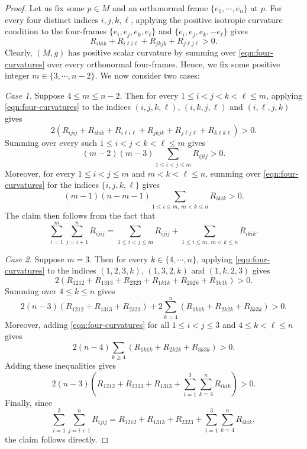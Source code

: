 \documentclass[11pt]{amsart}
\theoremstyle{definition}
\begin{document}
\begin{proof}
    Let us fix some $p\in M$ and an orthonormal frame $\{e_1,\cdots,e_n\}$ at $p$. For every four distinct indices $i,j,k,\ell$, applying the positive isotropic curvature condition to the four-frames $\{e_i,e_j,e_k,e_{\ell}\}$ and $\{e_i,e_j,e_k,-e_{\ell}\}$ gives
    \begin{equation}\label{eqn:four-curvatures}
    R_{ikik}+R_{i\ell i\ell}+R_{jkjk}+R_{j\ell j\ell}>0.
    \end{equation}
    Clearly, $(M,g)$ has positive scalar curvature by summing over \eqref{eqn:four-curvatures} over every orthonormal four-frames. Hence, we fix some positive integer $m\in \{3,\cdots,n-2\}$. We now consider two cases:

    \textit{Case 1.} Suppose $4\leq m\leq n-2$. Then for every $1\leq i<j<k<\ell\leq m$, applying \eqref{eqn:four-curvatures} to the indices $(i,j,k,\ell)$, $(i,k,j,\ell)$ and $(i,\ell,j,k)$ gives
    \[
    2(R_{ijij}+R_{ikik}+R_{i\ell i\ell}+R_{jkjk}+R_{j\ell j\ell}+R_{k\ell k\ell})>0.
    \]
    Summing over every such $1\leq i<j<k<\ell\leq m$ gives
    \[
        (m-2)(m-3)\sum_{1\leq i<j\leq m}R_{ijij}>0.
    \]
    Moreover, for every $1\leq i<j\leq m$ and $m<k<\ell\leq n$, summing over \eqref{eqn:four-curvatures} for the indices $\{i,j,k,\ell\}$ gives
    \[
        (m-1)(n-m-1)\sum_{1\leq i\leq m,\,m<k\leq n}R_{ikik}>0.
    \]
    The claim then follows from the fact that  
    \[\sum_{i=1}^m\sum_{j=i+1}^nR_{ijij}=\sum_{1\leq i<j\leq m}R_{ijij}+\sum_{1\leq i\leq m,\,m<k\leq n}R_{ikik}.
    \]
    
    \textit{Case 2.} Suppose $m=3$. Then for every $k\in \{4,\cdots,n\}$, applying \eqref{eqn:four-curvatures} to the indices $(1,2,3,k)$, $(1,3,2,k)$ and $(1,k,2,3)$ gives
    \[
    2(R_{1212}+R_{1313}+R_{2323}+R_{1k1k}+R_{2k2k}+R_{3k3k})>0.
    \]
    Summing over $4\leq k\leq n$ gives $$2(n-3)(R_{1212}+R_{1313}+R_{2323})+2\sum_{k=4}^n(R_{1k1k}+R_{2k2k}+R_{3k3k})>0.$$ 
    Moreover, adding \eqref{eqn:four-curvatures} for all $1\leq i<j\leq 3$ and $4\leq k<\ell\leq n$ gives
    \[
    2(n-4)\sum_{k\geq 4}(R_{1k1k}+R_{2k2k}+R_{3k3k})>0.
    \]
    Adding these inequalities gives
    \[
    2(n-3)(R_{1212}+R_{2323}+R_{1313}+\sum_{i=1}^3\sum_{k=4}^nR_{ikik})>0.
    \]
    Finally, since $$\sum_{i=1}^3\sum_{j=i+1}^nR_{ijij}=R_{1212}+R_{1313}+R_{2323}+\sum_{i=1}^3\sum_{k=4}^nR_{ikik},$$ the claim follows directly.
\end{proof}
\end{document}

